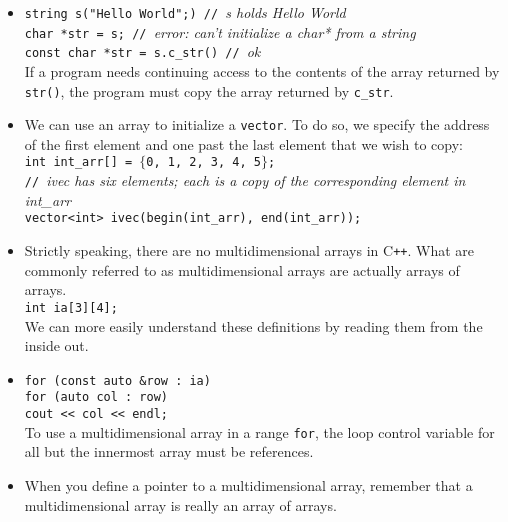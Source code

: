 \begin{itemize}
\item
\hspace*{1em}\texttt{string s("Hello World";) // }\textit{s holds Hello World}\\
\hspace*{1em}\texttt{char *str = s; // }\textit{error: can't initialize a char* from a string}\\
\hspace*{1em}\texttt{const char *str = s.c\_str() // }\textit{ok}\\
If a program needs continuing access to the contents of the array returned by \texttt{str()}, the program must copy the array returned by \texttt{c\_str}.

\item
We can use an array to initialize a \texttt{vector}. To do so, we specify the address of the first element and one past the last element that we wish to copy:\\
\hspace*{1em}\texttt{int int\_arr[] = $\{$0, 1, 2, 3, 4, 5$\}$;}\\
\hspace*{1em}\texttt{// }\textit{ivec has six elements; each is a copy of the corresponding element in int\_arr}\\
\hspace*{1em}\texttt{vector<int> ivec(begin(int\_arr), end(int\_arr));}

\item
Strictly speaking, there are no multidimensional arrays in C\texttt{++}. What are commonly referred to as multidimensional arrays are actually arrays of arrays.\\
\hspace*{1em}\texttt{int ia[3][4];}\\
We can more easily understand these definitions by reading them from the inside out.

\item
\hspace*{1em}\texttt{for (const auto \&row : ia)}\\
\hspace*{3em}\texttt{for (auto col : row)}\\
\hspace*{5em}\texttt{cout << col << endl;}\\
To use a multidimensional array in a range \texttt{for}, the loop control variable for all but the innermost array must be references.

\item
When you define a pointer to a multidimensional array, remember that a multidimensional array is really an array of arrays.

\end{itemize}